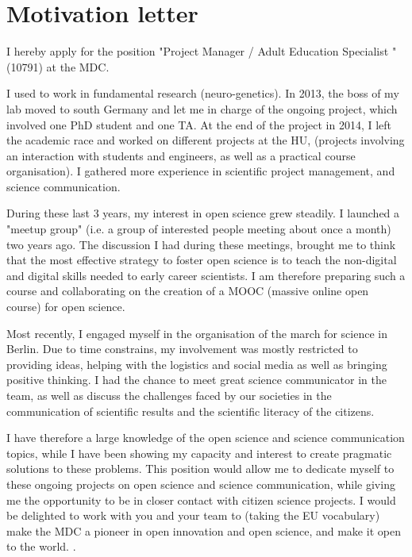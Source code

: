 \section* {Motivation letter}

I hereby apply for the position "Project Manager / Adult Education Specialist " (10791) at the MDC.%

I used to work in fundamental research (neuro-genetics). In 2013, the boss of my lab moved to south Germany and let me in charge of the ongoing project, which involved one PhD student and one TA. At the end of the project in 2014, I left the academic race and worked on different projects at the HU, (projects involving an interaction with students and engineers, as well as a practical course organisation).  I gathered more experience in scientific project management, and science communication.

During these last 3 years, my interest in open science grew steadily. I launched a "meetup group" (i.e. a group of interested people meeting about once a month) two years ago. The discussion I had during these meetings, brought me to think that the most effective strategy to foster open science is to teach the non-digital and digital skills needed to early career scientists. I am therefore preparing such a course and collaborating on the creation of a MOOC (massive online open course) for open science.

Most recently, I engaged myself in the organisation of the march for science in Berlin. Due to time constrains, my involvement was mostly restricted to providing ideas, helping with the logistics and social media as well as bringing positive thinking. I had the chance to meet great science communicator in the team, as well as discuss the challenges faced by our societies in the communication of scientific results and the scientific literacy of the citizens.

I have therefore a large knowledge of the open science and science communication topics, while I have been showing my capacity and interest to create pragmatic solutions to these problems. This position would  allow me to dedicate myself to these ongoing projects on open science and science communication, while giving me the opportunity to be in closer contact with citizen science projects. I would be delighted to work with you and your team to (taking the EU vocabulary) make the MDC a pioneer in open innovation and open science, and make it open to the world. .

